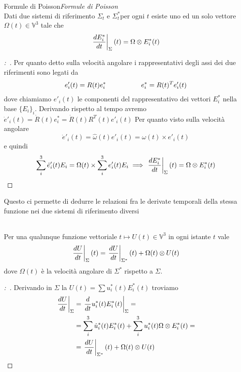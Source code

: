 \documentclass[11pt,a4paper,twoside]{book}
\newenvironment{proposizione}[1][\empty]{\begin{Proposizione}{
\ifx\empty#1\relax\else\mdseries\itshape#1\\\fi
}{}}{\end{Proposizione}}
\newenvironment{dimo}[1][\proofname]{
	\begin{tcolorbox}[
	breakable, 
	enhanced, 
	interior hidden, 
	frame hidden, 
	borderline west = {1pt}{0pt}{gray}, 
	top=0pt, bottom=0pt, left=0pt]
\begin{proof}[#1:~]
}
{
\end{proof}
\end{tcolorbox}
}
\theoremstyle{esss}
\theoremstyle{dotless}
\numberwithin{equation}{section} %
\begin{document}
\begin{proposizione}[Formule di Poisson]
Dati due sistemi di riferimento $\Sigma_t$ e $\Sigma^*_t$per ogni $t$ esiste uno ed un solo vettore $\Omega(t)\in\mathbb{V}^3$ tale che
\[
\left. \dfrac{dE_i^*}{dt} \right|_{\Sigma} (t)=\Omega\otimes E_i^*(t)
\]
\end{proposizione}
\begin{dimo}
Per quanto detto sulla velocità angolare i rappresentativi degli assi dei due riferimenti sono legati da\footnotemark[2]
\[
e'_i(t)=R(t)e^*_i \hspace{0.15\linewidth} e^*_i=R(t)^Te'_i(t)
\]
dove chiamiamo $e'_i(t)$ le componenti del rappresentativo dei vettori $E^*_i$ nella base $\{E_i\}_i$.
Derivando rispetto al tempo avremo $\dot{e}'_i(t)=\dot{R}(t)e^*_i=\dot{R}(t)R^T(t)e'_i(t)$
Per quanto visto sulla velocità angolare
\[
\dot{e}'_i(t)=\hat{\omega}(t) e'_i(t)=\omega(t)\times e'_i(t)
\]
e quindi
\[
\sum_i^3 \dot{e}'_i(t) E_i = \Omega(t)\times\sum_i^3  e'_i(t) E_i \implies \left. \dfrac{dE_i^*}{dt} \right|_{\Sigma} (t)=\Omega\otimes E_i^*(t)   \qedhere
\]

\end{dimo}
Questo ci permette di dedurre le relazioni fra le derivate temporali della stessa funzione nei due sistemi di riferimento diversi

\begin{proposizione}
Per una qualunque funzione vettoriale $t\mapsto U(t)\in\mathbb{V}^3$ in ogni istante $t$ vale
\begin{equation}
\left. \dfrac{d U}{dt} \right|_\Sigma (t) = \left. \dfrac{dU}{dt} \right|_{\Sigma^*}(t) + \Omega(t) \otimes U(t)
\end{equation}
dove $\Omega(t)$ è la velocità angolare di $\Sigma^*$ rispetto a $\Sigma$.
\end{proposizione}
\begin{dimo}
Derivando in $\Sigma$ la $U(t)=\sum u_i^*(t)E_i^*(t)$ troviamo\footnotemark{}
\begin{align*}
\left. \dfrac{dU}{dt}\right|_{\Sigma} &= \left. \dfrac{d}{dt} u^*_i(t) E_i^*(t) \right|_{\Sigma} =\\
& = \sum_i^3 \dot{u}^*_i(t) E_{i}^*(t) + \sum_i^3 u^*_i(t) \Omega\otimes E_i^*(t) = \\
& = \left. \dfrac{dU}{dt} \right|_{\Sigma^*}(t) + \Omega(t) \otimes U(t) \qedhere
\end{align*}
\end{dimo}
\end{document}
